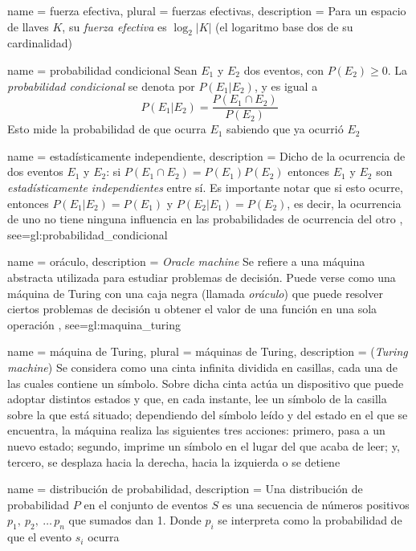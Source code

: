 {
  name = fuerza efectiva,
  plural = fuerzas efectivas,
  description = {
    Para un espacio de llaves $ K $, su \textit{fuerza efectiva} es
    $ \log_2 | K | $ (el logaritmo base dos de su cardinalidad)%
  }
}

{
  name = probabilidad condicional
}
{%
  Sean $ E_1 $ y $ E_2 $ dos eventos, con $ P(E_2) \ge 0 $. La
  \textit{probabilidad condicional} se denota por $ P(E_1 | E_2) $, y es
  igual a
  $$ P(E_1 | E_2) = \frac{P(E_1 \cap E_2)}{P(E_2)} $$
  Esto mide la probabilidad de que ocurra $ E_1 $ sabiendo que ya ocurrió
  $ E_2 $%
}

{
  name = estadísticamente independiente,
  description = {
    Dicho de la ocurrencia de dos eventos $ E_1 $ y $ E_2 $: si
    $ P(E_1 \cap E_2) = P(E_1) P(E_2) $ entonces $ E_1 $ y $ E_2 $ son
    \textit{estadísticamente independientes} entre sí. Es importante notar
    que si esto ocurre, entonces $ P(E_1 | E_2) = P(E_1) $ y
    $ P(E_2 | E_1) = P(E_2) $, es decir, la ocurrencia de uno no tiene ninguna
    influencia en las probabilidades de ocurrencia del otro%
  },
  see={gl:probabilidad_condicional}
}

{
  name = oráculo,
  description = {
    \textit{Oracle machine} Se refiere a una máquina abstracta utilizada para
    estudiar problemas de decisión. Puede verse como una máquina de Turing con
    una caja negra (llamada \textit{oráculo}) que puede resolver ciertos
    problemas de decisión u obtener el valor de una función en una sola
    operación%
  },
  see={gl:maquina_turing}
}

{
  name = máquina de Turing,
  plural = máquinas de Turing,
  description = {
    (\textit{Turing machine}) Se considera como una cinta infinita dividida
    en casillas, cada una de las cuales contiene un símbolo. Sobre dicha cinta
    actúa un dispositivo que puede adoptar distintos estados y que, en cada
    instante, lee un símbolo de la casilla sobre la que está situado;
    dependiendo del símbolo leído y del estado en el que se encuentra, la
    máquina realiza las siguientes tres acciones: primero, pasa a un nuevo
    estado; segundo, imprime un símbolo en el lugar del que acaba de leer;
    y, tercero, se desplaza hacia la derecha, hacia la izquierda o se detiene%
  }
}

{
  name = distribución de probabilidad,
  description = {
    Una distribución de probabilidad $P$ en el conjunto de eventos $S$ es 
    una secuencia de números positivos $p_1,\: p_2,\: \dots\, p_n$ que 
    sumados dan 1. Donde $p_i$ se interpreta como la probabilidad de 
    que el evento $s_i$ ocurra%
  }
}

